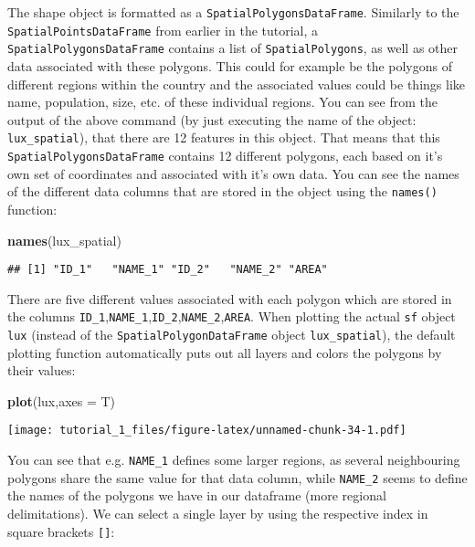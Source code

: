 \documentclass[]{article}
\newenvironment{Shaded}{\begin{snugshade}}{\end{snugshade}}
\newcommand{\DataTypeTok}[1]{\textcolor[rgb]{0.13,0.29,0.53}{#1}}
\newcommand{\KeywordTok}[1]{\textcolor[rgb]{0.13,0.29,0.53}{\textbf{#1}}}
\newcommand{\NormalTok}[1]{#1}
\begin{document}
The shape object is formatted as a \texttt{SpatialPolygonsDataFrame}.
Similarly to the \texttt{SpatialPointsDataFrame} from earlier in the
tutorial, a \texttt{SpatialPolygonsDataFrame} contains a list of
\texttt{SpatialPolygons}, as well as other data associated with these
polygons. This could for example be the polygons of different regions
within the country and the associated values could be things like name,
population, size, etc. of these individual regions. You can see from the
output of the above command (by just executing the name of the object:
\texttt{lux\_spatial}), that there are 12 features in this object. That
means that this \texttt{SpatialPolygonsDataFrame} contains 12 different
polygons, each based on it's own set of coordinates and associated with
it's own data. You can see the names of the different data columns that
are stored in the object using the \texttt{names()} function:

\begin{Shaded}
\begin{Highlighting}[]
\KeywordTok{names}\NormalTok{(lux_spatial)}
\end{Highlighting}
\end{Shaded}

\begin{verbatim}
## [1] "ID_1"   "NAME_1" "ID_2"   "NAME_2" "AREA"
\end{verbatim}

There are five different values associated with each polygon which are
stored in the columns
\texttt{ID\_1},\texttt{NAME\_1},\texttt{ID\_2},\texttt{NAME\_2},\texttt{AREA}.
When plotting the actual \texttt{sf} object \texttt{lux} (instead of the
\texttt{SpatialPolygonDataFrame} object \texttt{lux\_spatial}), the
default plotting function automatically puts out all layers and colors
the polygons by their values:

\begin{Shaded}
\begin{Highlighting}[]
\KeywordTok{plot}\NormalTok{(lux,}\DataTypeTok{axes =}\NormalTok{ T)}
\end{Highlighting}
\end{Shaded}

\texttt{[image: tutorial\_1\_files/figure-latex/unnamed-chunk-34-1.pdf]}

You can see that e.g. \texttt{NAME\_1} defines some larger regions, as
several neighbouring polygons share the same value for that data column,
while \texttt{NAME\_2} seems to define the names of the polygons we have
in our dataframe (more regional delimitations). We can select a single
layer by using the respective index in square brackets \texttt{{[}{]}}:
\end{document}
